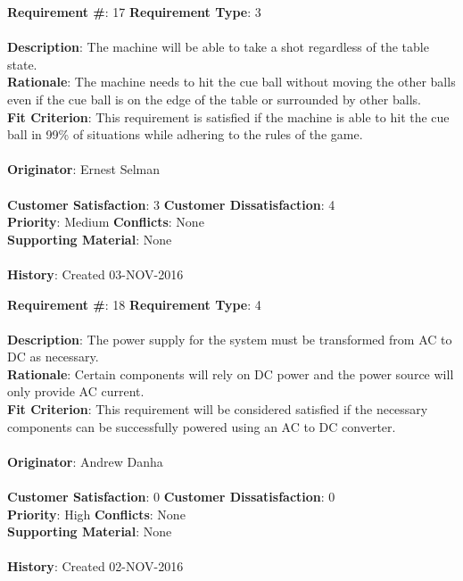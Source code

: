\documentclass[titlepage]{article}
\begin{document}
\begin{framed}
	\noindent\textbf{Requirement \#}: 17 \hfill \textbf{Requirement Type}: 3 \hfill\\\\
	\noindent\textbf{Description}: The machine will be able to take a shot regardless of the table state.\\
	\textbf{Rationale}: The machine needs to hit the cue ball without moving the other balls even if the cue ball is on the edge of the table or surrounded by other balls.\\
	\textbf{Fit Criterion}: This requirement is satisfied if the machine is able to hit the cue ball in 99\% of situations while adhering to the rules of the game.\\\\
	\textbf{Originator}: Ernest Selman\\\\
	\noindent\textbf{Customer Satisfaction}: 3 \hfill 	\textbf{Customer Dissatisfaction}: 4 \hfill\\
	\textbf{Priority}: Medium \hfill \textbf{Conflicts}: None \hfill\\
	\textbf{Supporting Material}: None\\\\
	\noindent\textbf{History}: Created 03-NOV-2016
\end{framed}

\begin{framed}
	\noindent\textbf{Requirement \#}: 18 \hfill \textbf{Requirement Type}: 4 \hfill\\\\
	\noindent\textbf{Description}: The power supply for the system must be transformed from AC to DC as necessary.\\
	\textbf{Rationale}: Certain components will rely on DC power and the power source will only provide AC current.\\
	\textbf{Fit Criterion}: This requirement will be considered satisfied if the necessary components can be successfully powered using an AC to DC converter.\\\\
	\textbf{Originator}: Andrew Danha\\\\ 
	\noindent\textbf{Customer Satisfaction}: 0 \hfill 	\textbf{Customer Dissatisfaction}: 0 \hfill\\
	\textbf{Priority}: High \hfill \textbf{Conflicts}: None \hfill\\
	\textbf{Supporting Material}: None\\\\
	\noindent\textbf{History}: Created 02-NOV-2016
\end{framed}
\end{document}
